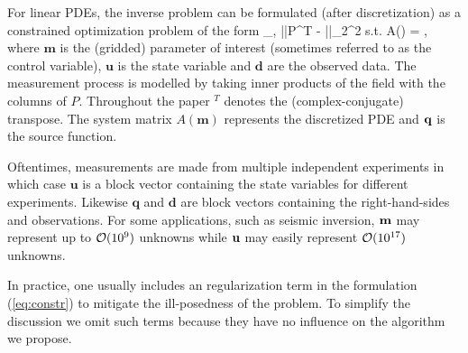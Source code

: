 \documentclass{iopart}
\begin{document}
For linear PDEs, the inverse problem can be formulated (after discretization) as a constrained optimization problem of the form
\bq
\label{eq:constr}
\min_{,} ||P^T - ||_2^2  \quad 
\mbox{s.t.} \quad A() = ,
\eq
where $\mathbf{m}$ is the (gridded) parameter of interest (sometimes referred to as the control variable), $\mathbf{u}$ is the state variable and $\mathbf{d}$ are
the observed data. The measurement process is modelled by taking inner products of the field with the columns of $P$. 
Throughout the paper $^T$ denotes the (complex-conjugate) transpose. The system matrix $A(\mathbf{m})$ 
represents the discretized PDE and $\mathbf{q}$ is the source function. 

Oftentimes, measurements are made from multiple independent experiments
in which case $\mathbf{u}$ is a block vector containing the state variables for different experiments. 
Likewise $\mathbf{q}$ and $\mathbf{d}$ are block vectors containing the right-hand-sides and observations.
For some applications, such as seismic inversion, $\mathbf{m}$ may represent up to $\mathcal{O}(10^9)$ unknowns 
while $\mathbf{u}$ may easily represent $\mathcal{O}(10^{17})$ unknowns.

In practice, one usually includes an regularization term in the formulation (\ref{eq:constr}) to mitigate the ill-posedness of the problem.
To simplify the discussion we omit such terms because they have no influence on the algorithm we propose.
\end{document}
